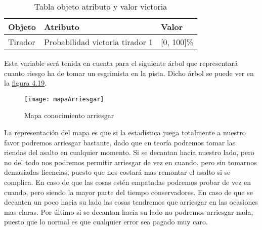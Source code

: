 \begin{longtable}{lll}
  \caption{Tabla objeto atributo y valor victoria}
  \label{tab:Tabla objeto atributo y valor victoria}

  \endfirsthead
  \endhead

  Objeto & Atributo & Valor \\ \hline
  \multicolumn{1}{l|}{Tirador} & Probabilidad victoria tirador 1 & [0, 100]\%
\end{longtable}

Esta variable será tenida en cuenta para el siguiente árbol que representará
cuanto riesgo ha de tomar un esgrimista en la pista. Dicho árbol se puede
ver en la \hyperref[fig:Mapa conocimiento arriesgar]{figura 4.19}.

\begin{figure}[htb]
  \centering
    \texttt{[image: mapaArriesgar]}
  \caption[Mapa conocimiento arriesgar]{Mapa conocimiento arriesgar}
  \label{fig:Mapa conocimiento arriesgar}
\end{figure}

La representación del mapa es que si la estadística juega totalmente a nuestro favor
podremos arriesgar bastante, dado que en teoría podremos tomar las riendas del asalto
en cualquier momento. Si se decantan hacia nuestro lado, pero no del todo nos podremos
permitir arriesgar de vez en cuando, pero sin tomarnos demasiadas licencias, puesto que
nos costará mas remontar el asalto si se complica. En caso de que las cosas estén empatadas
podremos probar de vez en cuando, pero siendo la mayor parte del tiempo conservadores. En
caso de que se decanten un poco hacia su lado las cosas tendremos que arriesgar en las ocasiones
mas claras. Por último si se decantan hacia su lado no podremos arriesgar nada, puesto que lo normal
es que cualquier error sea pagado muy caro.
